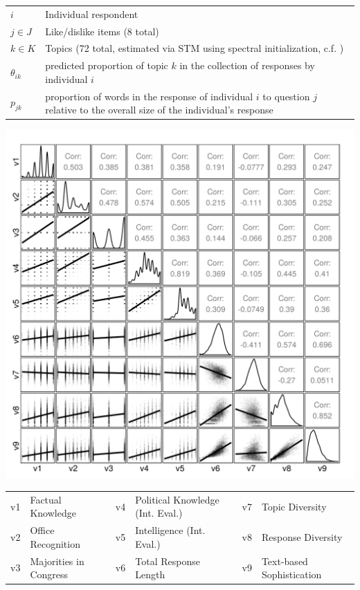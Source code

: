 \documentclass[a0,landscape]{a0poster}
\begin{document}
\begin{multicols}{4}
\begin{center}
\begin{tabular}{lp{22cm}}
\toprule 
$i$ & Individual respondent \\
$j \in J$ & Like/dislike items (8 total) \\
$k \in K$ & Topics (72 total, estimated via STM using spectral initialization, c.f. \citealt{roberts2014structural}) \\
$\theta_{ik}$ & predicted proportion of topic $k$ in the collection of responses by individual $i$\\
$p_{jk}$ & proportion of words in the response of individual $i$ to question $j$ relative to the overall size of the individual's response\\
\bottomrule
\end{tabular}
\end{center}

\begin{center}\footnotesize
\includegraphics[width=\linewidth]{figures/corplot.png}
\begin{tabular}[ht]{llllll}
\toprule
v1 & Factual Knowledge & v4 & Political Knowledge (Int. Eval.) & v7 & Topic Diversity \\
v2 & Office Recognition & v5 & Intelligence (Int. Eval.) & v8 & Response Diversity \\
v3 & Majorities in Congress & v6 & Total Response Length &  v9 & Text-based Sophistication \\
\bottomrule
\end{tabular}
\end{center}


\end{multicols}
\end{document}
